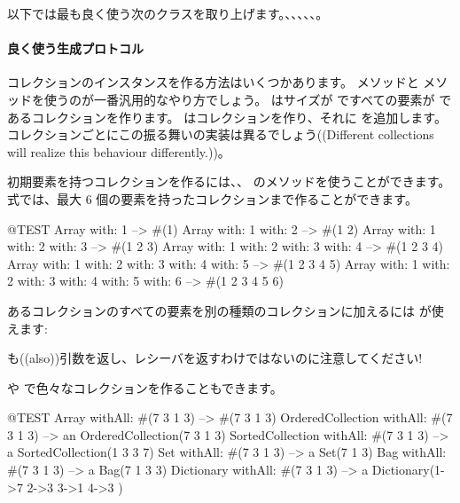 \documentclass[a4paper,10pt,twoside]{book}
\begin{document}
以下では最も良く使う次のクラスを取り上げます。、、、、、。

\paragraph{良く使う生成プロトコル}
コレクションのインスタンスを作る方法はいくつかあります。 メソッドと  メソッドを使うのが一番汎用的なやり方でしょう。 はサイズが  ですべての要素が  であるコレクションを作ります。  はコレクションを作り、それに  を追加します。コレクションごとにこの振る舞いの実装は異るでしょう((Different collections will realize this behaviour differently.))。

初期要素を持つコレクションを作るには、、 \etc のメソッドを使うことができます。 式では、最大 6 個の要素を持ったコレクションまで作ることができます。

\begin{code}{@TEST}
Array with: 1 --> #(1)
Array with: 1 with: 2 --> #(1 2)
Array with: 1 with: 2 with: 3 --> #(1 2 3)
Array with: 1 with: 2 with: 3 with: 4 --> #(1 2 3 4)
Array with: 1 with: 2 with: 3 with: 4 with: 5 --> #(1 2 3 4 5)
Array with: 1 with: 2 with: 3 with: 4 with: 5 with: 6 --> #(1 2 3 4 5 6)
\end{code}

あるコレクションのすべての要素を別の種類のコレクションに加えるには  が使えます:

\noindent
{} も((also))引数を返し、レシーバを返すわけではないのに注意してください!

 や  で色々なコレクションを作ることもできます。

\begin{code}{@TEST}
Array withAll: #(7 3 1 3)                      --> #(7 3 1 3)
OrderedCollection withAll: #(7 3 1 3) --> an OrderedCollection(7 3 1 3)
SortedCollection withAll: #(7 3 1 3)    --> a SortedCollection(1 3 3 7)
Set withAll: #(7 3 1 3)                         --> a Set(7 1 3)
Bag withAll: #(7 3 1 3)                        --> a Bag(7 1 3 3)
Dictionary withAll: #(7 3 1 3)               --> a Dictionary(1->7 2->3 3->1 4->3 )
\end{code}
\end{document}

